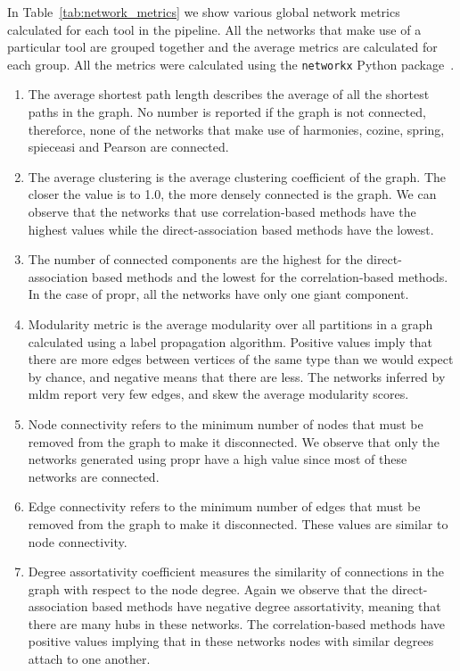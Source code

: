   In Table~\ref{tab:network_metrics} we show various global network metrics calculated for each tool in the pipeline.
  All the networks that make use of a particular tool are grouped together and the average metrics are calculated for each group.
  All the metrics were calculated using the \texttt{networkx} Python package~\cite{hagbergExploringNetworkStructure2008}.
  \begin{enumerate}
    \item The average shortest path length describes the average of all the shortest paths in the graph. No number is reported if the graph is not connected, thereforce, none of the networks that make use of \ac{harmonies}, \ac{cozine}, \ac{spring}, \ac{spieceasi} and Pearson are connected.
    \item The average clustering is the average clustering coefficient of the graph. The closer the value is to 1.0, the more densely connected is the graph. We can observe that the networks that use correlation-based methods have the highest values while the direct-association based methods have the lowest.
    \item The number of connected components are the highest for the direct-association based methods and the lowest for the correlation-based methods. In the case of propr, all the networks have only one giant component.
    \item Modularity metric is the average modularity over all partitions in a graph calculated using a label propagation algorithm. Positive values imply that there are more edges between vertices of the same type than we would expect by chance, and negative means that there are less. The networks inferred by \ac{mldm} report very few edges, and skew the average modularity scores.
    \item Node connectivity refers to the minimum number of nodes that must be removed from the graph to make it disconnected. We observe that only the networks generated using propr have a high value since most of these networks are connected.
    \item Edge connectivity refers to the minimum number of edges that must be removed from the graph to make it disconnected. These values are similar to node connectivity.
    \item Degree assortativity coefficient measures the similarity of connections in the graph with respect to the node degree. Again we observe that the direct-association based methods have negative degree assortativity, meaning that there are many hubs in these networks. The correlation-based methods have positive values implying that in these networks nodes with similar degrees attach to one another.
  \end{enumerate}

